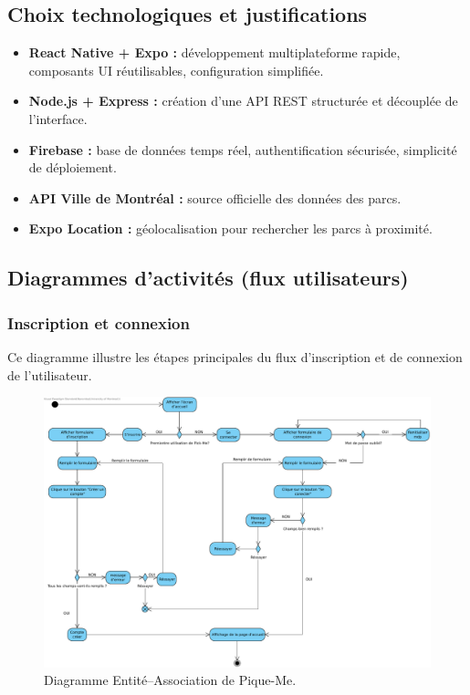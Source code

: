 \documentclass[12pt,a4paper]{article}
\begin{document}
\subsection{Choix technologiques et justifications}

\begin{itemize}
  \item \textbf{React Native + Expo :} développement multiplateforme rapide, composants UI réutilisables, configuration simplifiée.
  \item \textbf{Node.js + Express :} création d'une API REST structurée et découplée de l'interface.
  \item \textbf{Firebase :} base de données temps réel, authentification sécurisée, simplicité de déploiement.
  \item \textbf{API Ville de Montréal :} source officielle des données des parcs.
  \item \textbf{Expo Location :} géolocalisation pour rechercher les parcs à proximité.
\end{itemize}

\subsection{Diagrammes d'activités (flux utilisateurs)}

\subsubsection{Inscription et connexion}

Ce diagramme illustre les étapes principales du flux d'inscription et de connexion de l'utilisateur.

\begin{figure}[h!]
  \centering
  \includegraphics[width=0.9\linewidth]{attachments/Inscription_Connexion.pdf}
  \caption{Diagramme Entité–Association de Pique-Me.}
\end{figure}
\end{document}

